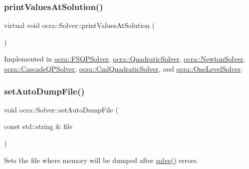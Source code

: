 \hypertarget{classocra_1_1Solver_ab1903098e25c16a9f92c36d37967e8fa}{}\label{classocra_1_1Solver_ab1903098e25c16a9f92c36d37967e8fa} 
\subsubsection{\texorpdfstring{print\+Values\+At\+Solution()}{printValuesAtSolution()}}
{\footnotesize\ttfamily virtual void ocra\+::\+Solver\+::print\+Values\+At\+Solution (\begin{DoxyParamCaption}{ }\end{DoxyParamCaption})\hspace{0.3cm}{\ttfamily [pure virtual]}}



Implemented in \hyperlink{classocra_1_1FSQPSolver_ad41514dc166b19fca4812b5521777f0a}{ocra\+::\+F\+S\+Q\+P\+Solver}, \hyperlink{classocra_1_1QuadraticSolver_a848c996e3a918c6cb0db3edf66c04cc1}{ocra\+::\+Quadratic\+Solver}, \hyperlink{classocra_1_1NewtonSolver_a92d33f1dfe684de2051d0389816cf9a5}{ocra\+::\+Newton\+Solver}, \hyperlink{classocra_1_1CascadeQPSolver_a1f4c5d709ce4545c596c864b1d99d08c}{ocra\+::\+Cascade\+Q\+P\+Solver}, \hyperlink{classocra_1_1CmlQuadraticSolver_aed7554d599282ef5e8a7567b73b822b8}{ocra\+::\+Cml\+Quadratic\+Solver}, and \hyperlink{classocra_1_1OneLevelSolver_a90751a818854e6b91342f209fd5a0fd2}{ocra\+::\+One\+Level\+Solver}.

\hypertarget{classocra_1_1Solver_a913b2bf9a6d9f64c70ad1b5fbb09172f}{}\label{classocra_1_1Solver_a913b2bf9a6d9f64c70ad1b5fbb09172f} 
\subsubsection{\texorpdfstring{set\+Auto\+Dump\+File()}{setAutoDumpFile()}}
{\footnotesize\ttfamily void ocra\+::\+Solver\+::set\+Auto\+Dump\+File (\begin{DoxyParamCaption}\item[{const std\+::string \&}]{file }\end{DoxyParamCaption})}

Sets the file where memory will be dumped after \hyperlink{classocra_1_1Solver_a86151fea09399da16d6ce47abb1ba904}{solve()} errors.

